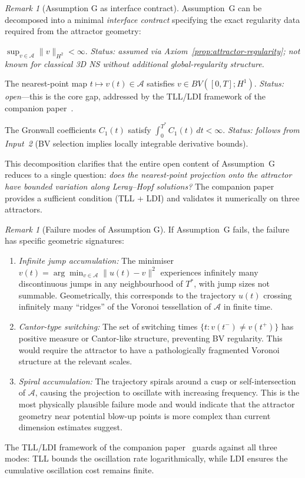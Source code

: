 \documentclass[12pt,a4paper]{article}
\theoremstyle{definition}
\theoremstyle{plain}
\theoremstyle{remark}
\newtheorem{remark}[definition]{Remark}
\begin{document}
\begin{remark}[Assumption G as interface contract]
\label{rem:g-interface-contract}
Assumption~G can be decomposed into a minimal \emph{interface contract} specifying the exact regularity data required from the attractor geometry:
\begin{description}[style=nextline]
\item[Input 1 (Attractor regularity):] $\sup_{v \in \mathcal{A}} \|v\|_{H^2} < \infty$. \emph{Status: assumed via Axiom~\ref{prop:attractor-regularity}; not known for classical 3D NS without additional global-regularity structure.}
\item[Input 2 (Selection regularity):] The nearest-point map $t \mapsto v(t) \in \mathcal{A}$ satisfies $v \in BV([0,T]; H^1)$. \emph{Status: open}---this is the core gap, addressed by the TLL/LDI framework of the companion paper~\cite{Geiger2026-LDI}.
\item[Input 3 (Gronwall integrability):] The Gronwall coefficients $C_1(t)$ satisfy $\int_0^{T^*} C_1(t)\,dt < \infty$. \emph{Status: follows from Input~2} (BV selection implies locally integrable derivative bounds).
\end{description}
This decomposition clarifies that the entire open content of Assumption~G reduces to a single question: \emph{does the nearest-point projection onto the attractor have bounded variation along Leray--Hopf solutions?} The companion paper provides a sufficient condition (TLL + LDI) and validates it numerically on three attractors.
\end{remark}

\begin{remark}[Failure modes of Assumption G]
\label{rem:failure-modes}
If Assumption~G fails, the failure has specific geometric signatures:
\begin{enumerate}
\item \emph{Infinite jump accumulation:} The minimiser $v(t) = \arg\min_{v \in \mathcal{A}} \|u(t) - v\|^2$ experiences infinitely many discontinuous jumps in any neighbourhood of $T^*$, with jump sizes not summable. Geometrically, this corresponds to the trajectory $u(t)$ crossing infinitely many ``ridges'' of the Voronoi tessellation of $\mathcal{A}$ in finite time.
\item \emph{Cantor-type switching:} The set of switching times $\{t : v(t^-) \neq v(t^+)\}$ has positive measure or Cantor-like structure, preventing BV regularity. This would require the attractor to have a pathologically fragmented Voronoi structure at the relevant scales.
\item \emph{Spiral accumulation:} The trajectory spirals around a cusp or self-intersection of $\mathcal{A}$, causing the projection to oscillate with increasing frequency. This is the most physically plausible failure mode and would indicate that the attractor geometry near potential blow-up points is more complex than current dimension estimates suggest.
\end{enumerate}
The TLL/LDI framework of the companion paper~\cite{Geiger2026-LDI} guards against all three modes: TLL bounds the oscillation rate logarithmically, while LDI ensures the cumulative oscillation cost remains finite.
\end{remark}
\end{document}
